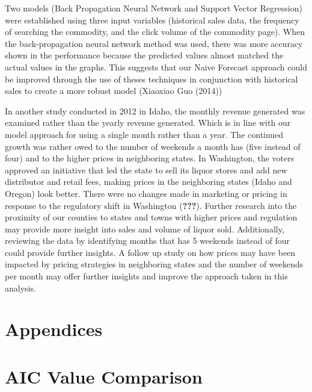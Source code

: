 \documentclass[]{elsarticle} %
\begin{document}
Two models (Back Propagation Neural Network and Support Vector
Regression) were established using three input variables (historical
sales data, the frequency of searching the commodity, and the click
volume of the commodity page). When the back-propagation neural network
method was used, there was more accuracy shown in the performance
because the predicted values almost matched the actual values in the
graphs. This suggests that our Naive Forecast approach could be improved
through the use of theses techniques in conjunction with historical
sales to create a more robust model (Xiaoxiao Guo (2014))

In another study conducted in 2012 in Idaho, the monthly revenue
generated was examined rather than the yearly revenue generated. Which
is in line with our model approach for using a single month rather than
a year. The continued growth was rather owed to the number of weekends a
month has (five instead of four) and to the higher prices in neighboring
states. In Washington, the voters approved an initiative that led the
state to sell its liquor stores and add new distributor and retail fees,
making prices in the neighboring states (Idaho and Oregon) look better.
There were no changes made in marketing or pricing in response to the
regulatory shift in Washington ({\textbf{???}}). Further research into
the proximity of our counties to states and towns with higher prices and
regulation may provide more insight into sales and volume of liquor
sold. Additionally, reviewing the data by identifying months that has 5
weekends instead of four could provide further insights. A follow up
study on how prices may have been impacted by pricing strategies in
neighboring states and the number of weekends per month may offer
further insights and improve the approach taken in this analysis.

\newpage

\section{Appendices}\label{appendices}

\section{AIC Value Comparison}\label{aic-value-comparison}
\end{document}
